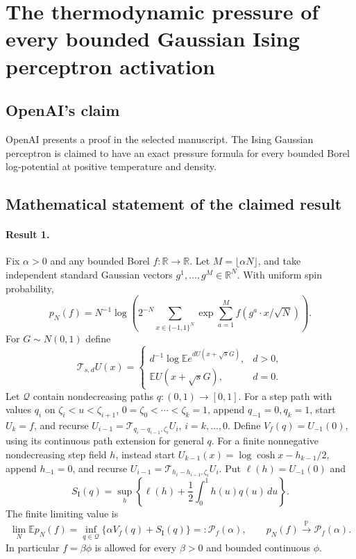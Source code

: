 \documentclass[11pt]{article}
\begin{document}
\section*{The thermodynamic pressure of every bounded Gaussian Ising perceptron activation}

\subsection{OpenAI's claim}
OpenAI presents a proof in the selected manuscript. The Ising Gaussian perceptron is claimed to have an exact pressure formula for every bounded Borel log-potential at positive temperature and density.

\subsection{Mathematical statement of the claimed result}
\paragraph{Result 1.} Fix $\alpha>0$ and any bounded Borel $f:\mathbb R\to\mathbb R$. Let $M=\lfloor\alpha N\rfloor$, and take independent standard Gaussian vectors $g^1,\ldots,g^M\in\mathbb R^N$. With uniform spin probability,
\[
 p_N(f)=N^{-1}\log\left(2^{-N}\sum_{x\in\{-1,1\}^N}
 \exp\sum_{a=1}^Mf(g^a\cdot x/\sqrt N)\right).
\]
For $G\sim N(0,1)$ define
\[
 \mathcal T_{s,d}U(x)=\begin{cases}d^{-1}\log\mathbb Ee^{dU(x+\sqrt sG)},&d>0,\\
 \mathbb EU(x+\sqrt sG),&d=0.\end{cases}
\]
Let $\mathcal Q$ contain nondecreasing paths $q:(0,1)\to[0,1]$. For a step path with values $q_i$ on $\zeta_i<u<\zeta_{i+1}$, $0=\zeta_0<\cdots<\zeta_k=1$, append $q_{-1}=0,q_k=1$, start $U_k=f$, and recurse $U_{i-1}=\mathcal T_{q_i-q_{i-1},\zeta_i}U_i$, $i=k,\ldots,0$. Define $V_f(q)=U_{-1}(0)$, using its continuous path extension for general $q$. For a finite nonnegative nondecreasing step field $h$, instead start $U_{k-1}(x)=\log\cosh x-h_{k-1}/2$, append $h_{-1}=0$, and recurse $U_{i-1}=\mathcal T_{h_i-h_{i-1},\zeta_i}U_i$. Put $\ell(h)=U_{-1}(0)$ and
\[
 S_{\mathrm I}(q)=\sup_h\left\{\ell(h)+\frac12\int_0^1h(u)q(u)\,du\right\}.
\]
The finite limiting value is
\[
 \lim_N\mathbb Ep_N(f)=\inf_{q\in\mathcal Q}\{\alpha V_f(q)+S_{\mathrm I}(q)\}=:\mathcal P_f(\alpha),
 \qquad p_N(f)\xrightarrow{\mathbb P}\mathcal P_f(\alpha).
\]
In particular $f=\beta\phi$ is allowed for every $\beta>0$ and bounded continuous $\phi$.
\end{document}
